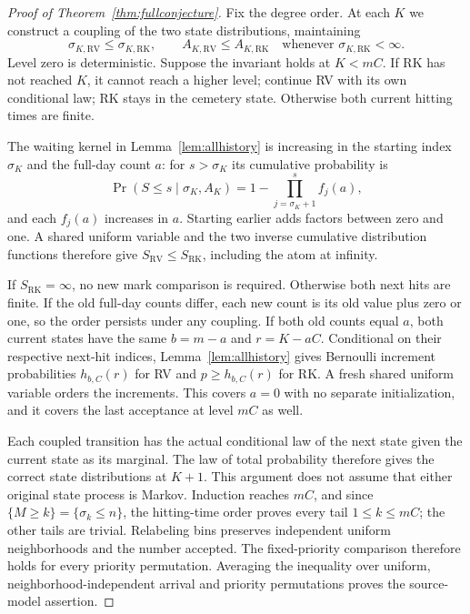 \documentclass[11pt]{article}
\newcommand{\RV}{\mathrm{RV}}
\newcommand{\RK}{\mathrm{RK}}
\begin{document}
\begin{proof}[Proof of Theorem~\ref{thm:fullconjecture}]
Fix the degree order. At each $K$ we construct a coupling of the two
state distributions, maintaining
\[
 \sigma_{K,\RV}\leq\sigma_{K,\RK},\qquad
 A_{K,\RV}\leq A_{K,\RK}
 \quad\text{whenever }\sigma_{K,\RK}<\infty.
\]
Level zero is deterministic. Suppose the invariant holds at $K<mC$.
If RK has not reached $K$, it cannot reach a higher level; continue
RV with its own conditional law; RK stays in the cemetery state.
Otherwise both current hitting times are finite.

The waiting kernel in Lemma~\ref{lem:allhistory} is increasing in
the starting index $\sigma_K$ and the full-day count $a$: for
$s>\sigma_K$ its cumulative probability is
\[
 \Pr(S\leq s\mid\sigma_K,A_K)
       =1-\prod_{j=\sigma_K+1}^s f_j(a),
\]
and each $f_j(a)$ increases in $a$. Starting earlier adds factors
between zero and one. A shared uniform variable and the two inverse
cumulative distribution functions therefore give
$S_\RV\leq S_\RK$, including the atom at infinity.

If $S_\RK=\infty$, no new mark comparison is required. Otherwise
both next hits are finite. If the old full-day counts differ, each
new count is its old value plus zero or one, so the order persists
under any coupling. If both old counts equal $a$, both current states
have the same $b=m-a$ and $r=K-aC$. Conditional on their respective
next-hit indices, Lemma~\ref{lem:allhistory} gives Bernoulli
increment probabilities $h_{b,C}(r)$ for RV and $p\geq h_{b,C}(r)$
for RK. A fresh shared uniform variable orders the increments.
This covers $a=0$ with no separate initialization, and it covers
the last acceptance at level $mC$ as well.

Each coupled transition has the actual conditional law of the next
state given the current state as its marginal. The law of total
probability therefore gives the correct state distributions at $K+1$.
This argument does not assume that either original state process is
Markov. Induction reaches $mC$, and since $\{M\geq k\}=\{\sigma_k\leq n\}$, the hitting-time order
proves every tail $1\leq k\leq mC$; the other tails are trivial.
Relabeling bins preserves independent uniform neighborhoods and the
number accepted. The fixed-priority comparison therefore holds for
every priority permutation. Averaging the inequality over uniform,
neighborhood-independent arrival and priority permutations proves
the source-model assertion.
\end{proof}
\end{document}
